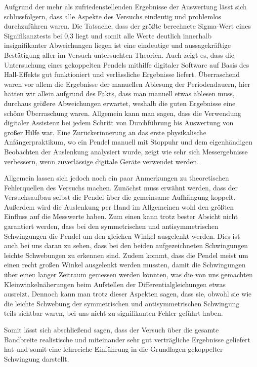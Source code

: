 \documentclass{article}
\begin{document}
Aufgrund der mehr als zufriedenstellenden Ergebnisse der Auswertung lässt sich schlussfolgern, dass alle Aspekte des Versuchs eindeutig und problemlos durchzuführen waren. Die Tatsache, dass der größte berechnete Sigma-Wert eines Signifikanztests bei 0,3 liegt und somit alle Werte deutlich innerhalb insignifikanter Abweichungen liegen ist eine eindeutige und aussagekräftige Bestätigung aller im Versuch untersuchten Theorien. Auch zeigt es, dass die Untersuchung eines gekoppelten Pendels mithilfe digitaler Software auf Basis des Hall-Effekts gut funktioniert und verlässliche Ergebnisse liefert. Überraschend waren vor allem die Ergebnisse der manuellen Ablesung der Periodendauern, hier hätten wir allein aufgrund des Fakts, dass man manuell etwas ablesen muss, durchaus größere Abweichungen erwartet, weshalb die guten Ergebnisse eine schöne Überraschung waren. Allgemein kann man sagen, dass die Verwendung digitaler Assistenz bei jedem Schritt von Durchführung bis Auswertung von großer Hilfe war. Eine Zurückerinnerung an das erste physikalische Anfängerpraktikum, wo ein Pendel manuell mit Stoppuhr und dem eigenhändigen Beobachten der Auslenkung analysiert wurde, zeigt wie sehr sich Messergebnisse verbessern, wenn zuverlässige digitale Geräte verwendet werden.

Allgemein lassen sich jedoch noch ein paar Anmerkungen zu theoretischen Fehlerquellen des Versuchs machen. Zunächst muss erwähnt werden, dass der Versuchsaufbau selbst die Pendel über die gemeinsame Aufhängung koppelt. Außerdem wird die Auslenkung per Hand im Allgemeinen wohl den größten Einfluss auf die Messwerte haben. Zum einen kann trotz bester Absicht nicht garantiert werden, dass bei den symmetrischen und antisymmetrischen Schwingungen die Pendel um den gleichen Winkel ausgelenkt werden. Dies ist auch bei uns daran zu sehen, dass bei den beiden aufgezeichneten Schwingungen leichte Schwebungen zu erkennen sind. Zudem kommt, dass die Pendel meist um einen recht großen Winkel ausgelenkt werden mussten, damit die Schwingungen über einen langer Zeitraum gemessen werden konnten, was die von uns gemachten Kleinwinkelnäherungen beim Aufstellen der Differentialgleichungen etwas ausreizt. Dennoch kann man trotz dieser Aspekten sagen, dass sie, obwohl sie wie die leichte Schwebung der symmetrischen und antisymmetrischen Schwingung teils sichtbar waren, bei uns nicht zu signifikanten Fehler geführt haben. 

Somit lässt sich abschließend sagen, dass der Versuch über die gesamte Bandbreite realistische und miteinander sehr gut verträgliche Ergebnisse geliefert hat und somit eine lehrreiche Einführung in die Grundlagen gekoppelter Schwingung darstellt.

\newpage

\end{document}
